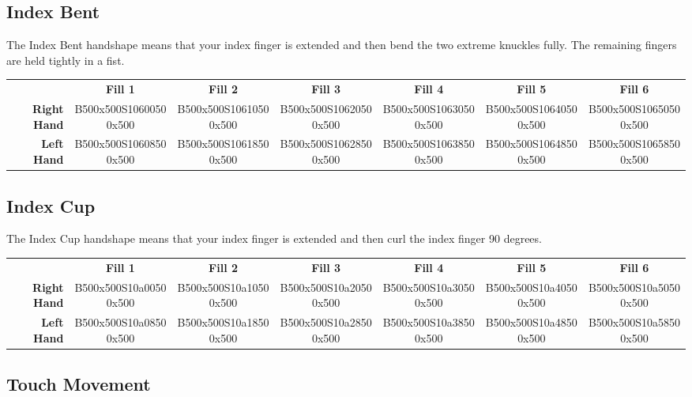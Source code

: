 \documentclass{article}
\begin{document}
\subsection{Index Bent}

The Index Bent handshape means that your index finger is extended and then bend the two extreme knuckles fully.
The remaining fingers are held tightly in a fist.

\begin{center}
\begin{tabular}{r*{6}{c}}
&\textbf{Fill 1}&\textbf{Fill 2}&\textbf{Fill 3}&\textbf{Fill 4}&\textbf{Fill 5}&\textbf{Fill 6}\\
\textbf{Right Hand}&
B500x500S10600500x500&
B500x500S10610500x500&
B500x500S10620500x500&
B500x500S10630500x500&
B500x500S10640500x500&
B500x500S10650500x500\\
\textbf{Left Hand}&
B500x500S10608500x500&
B500x500S10618500x500&
B500x500S10628500x500&
B500x500S10638500x500&
B500x500S10648500x500&
B500x500S10658500x500\\
\end{tabular}
\end{center}

\subsection{Index Cup}

The Index Cup handshape means that your index finger is extended and then curl the index finger 90 degrees.

\begin{center}
\begin{tabular}{r*{6}{c}}
&\textbf{Fill 1}&\textbf{Fill 2}&\textbf{Fill 3}&\textbf{Fill 4}&\textbf{Fill 5}&\textbf{Fill 6}\\
\textbf{Right Hand}&
B500x500S10a00500x500&
B500x500S10a10500x500&
B500x500S10a20500x500&
B500x500S10a30500x500&
B500x500S10a40500x500&
B500x500S10a50500x500\\
\textbf{Left Hand}&
B500x500S10a08500x500&
B500x500S10a18500x500&
B500x500S10a28500x500&
B500x500S10a38500x500&
B500x500S10a48500x500&
B500x500S10a58500x500\\
\end{tabular}
\end{center}

\subsection{Touch Movement}
\end{document}
